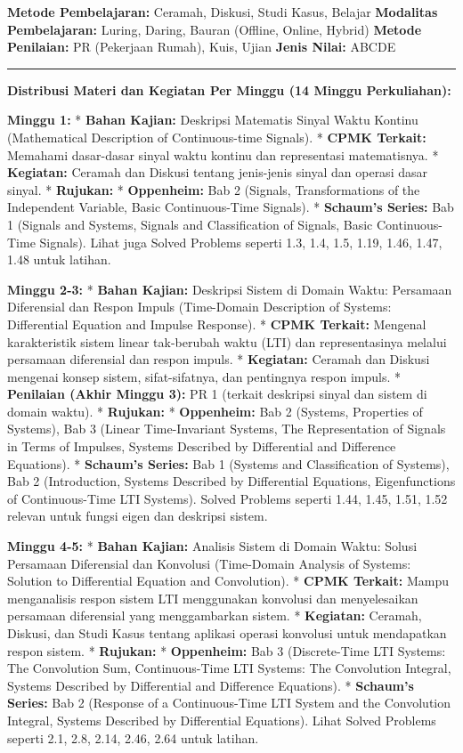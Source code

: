 \documentclass[
  letterpaper,
  DIV=11,
  numbers=noendperiod]{scrreprt}
\begin{document}
\textbf{Metode Pembelajaran:} Ceramah, Diskusi, Studi Kasus, Belajar
\textbf{Modalitas Pembelajaran:} Luring, Daring, Bauran (Offline,
Online, Hybrid) \textbf{Metode Penilaian:} PR (Pekerjaan Rumah), Kuis,
Ujian \textbf{Jenis Nilai:} ABCDE

\begin{center}\rule{0.5\linewidth}{0.5pt}\end{center}

\textbf{Distribusi Materi dan Kegiatan Per Minggu (14 Minggu
Perkuliahan):}

\textbf{Minggu 1:} * \textbf{Bahan Kajian:} Deskripsi Matematis Sinyal
Waktu Kontinu (Mathematical Description of Continuous-time Signals). *
\textbf{CPMK Terkait:} Memahami dasar-dasar sinyal waktu kontinu dan
representasi matematisnya. * \textbf{Kegiatan:} Ceramah dan Diskusi
tentang jenis-jenis sinyal dan operasi dasar sinyal. * \textbf{Rujukan:}
* \textbf{Oppenheim:} Bab 2 (Signals, Transformations of the Independent
Variable, Basic Continuous-Time Signals). * \textbf{Schaum's Series:}
Bab 1 (Signals and Systems, Signals and Classification of Signals, Basic
Continuous-Time Signals). Lihat juga Solved Problems seperti 1.3, 1.4,
1.5, 1.19, 1.46, 1.47, 1.48 untuk latihan.

\textbf{Minggu 2-3:} * \textbf{Bahan Kajian:} Deskripsi Sistem di Domain
Waktu: Persamaan Diferensial dan Respon Impuls (Time-Domain Description
of Systems: Differential Equation and Impulse Response). * \textbf{CPMK
Terkait:} Mengenal karakteristik sistem linear tak-berubah waktu (LTI)
dan representasinya melalui persamaan diferensial dan respon impuls. *
\textbf{Kegiatan:} Ceramah dan Diskusi mengenai konsep sistem,
sifat-sifatnya, dan pentingnya respon impuls. * \textbf{Penilaian (Akhir
Minggu 3):} PR 1 (terkait deskripsi sinyal dan sistem di domain waktu).
* \textbf{Rujukan:} * \textbf{Oppenheim:} Bab 2 (Systems, Properties of
Systems), Bab 3 (Linear Time-Invariant Systems, The Representation of
Signals in Terms of Impulses, Systems Described by Differential and
Difference Equations). * \textbf{Schaum's Series:} Bab 1 (Systems and
Classification of Systems), Bab 2 (Introduction, Systems Described by
Differential Equations, Eigenfunctions of Continuous-Time LTI Systems).
Solved Problems seperti 1.44, 1.45, 1.51, 1.52 relevan untuk fungsi
eigen dan deskripsi sistem.

\textbf{Minggu 4-5:} * \textbf{Bahan Kajian:} Analisis Sistem di Domain
Waktu: Solusi Persamaan Diferensial dan Konvolusi (Time-Domain Analysis
of Systems: Solution to Differential Equation and Convolution). *
\textbf{CPMK Terkait:} Mampu menganalisis respon sistem LTI menggunakan
konvolusi dan menyelesaikan persamaan diferensial yang menggambarkan
sistem. * \textbf{Kegiatan:} Ceramah, Diskusi, dan Studi Kasus tentang
aplikasi operasi konvolusi untuk mendapatkan respon sistem. *
\textbf{Rujukan:} * \textbf{Oppenheim:} Bab 3 (Discrete-Time LTI
Systems: The Convolution Sum, Continuous-Time LTI Systems: The
Convolution Integral, Systems Described by Differential and Difference
Equations). * \textbf{Schaum's Series:} Bab 2 (Response of a
Continuous-Time LTI System and the Convolution Integral, Systems
Described by Differential Equations). Lihat Solved Problems seperti 2.1,
2.8, 2.14, 2.46, 2.64 untuk latihan.
\end{document}
